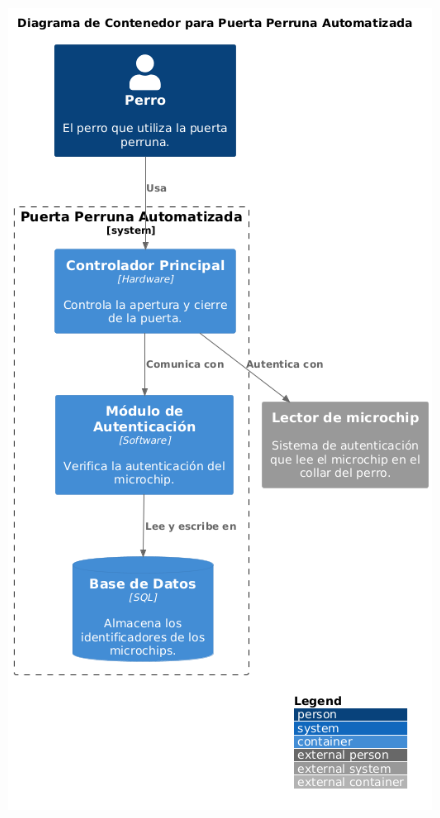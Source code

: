 \begin{figure}[!h] 
\centering
\includegraphics[scale=0.5]{Pictures/capt-asw/contenedoresPP.png}\caption{}
\end{figure}









